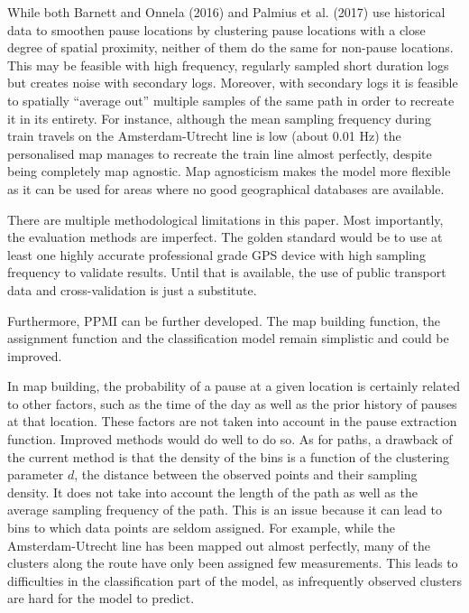 \documentclass[man]{apa6}
\theoremstyle{definition}
\theoremstyle{definition}
\theoremstyle{definition}
\theoremstyle{remark}
\begin{document}
While both Barnett and Onnela (2016) and Palmius et al. (2017) use
historical data to smoothen pause locations by clustering pause
locations with a close degree of spatial proximity, neither of them do
the same for non-pause locations. This may be feasible with high
frequency, regularly sampled short duration logs but creates noise with
secondary logs. Moreover, with secondary logs it is feasible to
spatially \enquote{average out} multiple samples of the same path in
order to recreate it in its entirety. For instance, although the mean
sampling frequency during train travels on the Amsterdam-Utrecht line is
low (about 0.01 Hz) the personalised map manages to recreate the train
line almost perfectly, despite being completely map agnostic. Map
agnosticism makes the model more flexible as it can be used for areas
where no good geographical databases are available.

There are multiple methodological limitations in this paper. Most
importantly, the evaluation methods are imperfect. The golden standard
would be to use at least one highly accurate professional grade GPS
device with high sampling frequency to validate results. Until that is
available, the use of public transport data and cross-validation is just
a substitute.

Furthermore, PPMI can be further developed. The map building function,
the assignment function and the classification model remain simplistic
and could be improved.

In map building, the probability of a pause at a given location is
certainly related to other factors, such as the time of the day as well
as the prior history of pauses at that location. These factors are not
taken into account in the pause extraction function. Improved methods
would do well to do so. As for paths, a drawback of the current method
is that the density of the bins is a function of the clustering
parameter \(d\), the distance between the observed points and their
sampling density. It does not take into account the length of the path
as well as the average sampling frequency of the path. This is an issue
because it can lead to bins to which data points are seldom assigned.
For example, while the Amsterdam-Utrecht line has been mapped out almost
perfectly, many of the clusters along the route have only been assigned
few measurements. This leads to difficulties in the classification part
of the model, as infrequently observed clusters are hard for the model
to predict.
\end{document}
